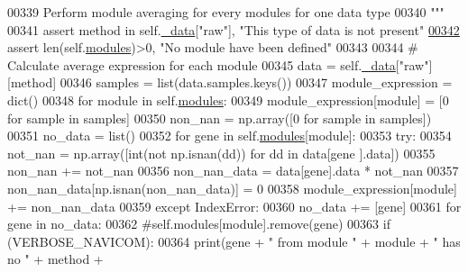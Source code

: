 \begin{DoxyCode}
00339 \textcolor{stringliteral}{        Perform module averaging for every modules for one data type}
00340 \textcolor{stringliteral}{        """}
00341         \textcolor{keyword}{assert} method \textcolor{keywordflow}{in} self.\hyperlink{classnavicom_1_1navicom_1_1NaviCom_a407b2b5c30a5652ee85c4be54b3e6679}{_data}[\textcolor{stringliteral}{"raw"}], \textcolor{stringliteral}{"This type of data is not present"}
\hypertarget{navicom_8py_source_l00342}{}\hyperlink{classnavicom_1_1navicom_1_1NaviCom_afd1a299b687bc97e171cff0a738b7b73}{00342}         \textcolor{keyword}{assert} len(self.\hyperlink{classnavicom_1_1navicom_1_1NaviCom_a56141660ddf29a36a8291e938246578c}{modules})>0, \textcolor{stringliteral}{"No module have been defined"}
00343 
00344         \textcolor{comment}{# Calculate average expression for each module}
00345         data = self.\hyperlink{classnavicom_1_1navicom_1_1NaviCom_a407b2b5c30a5652ee85c4be54b3e6679}{_data}[\textcolor{stringliteral}{"raw"}][method]
00346         samples = list(data.samples.keys())
00347         module\_expression = dict()
00348         \textcolor{keywordflow}{for} module \textcolor{keywordflow}{in} self.\hyperlink{classnavicom_1_1navicom_1_1NaviCom_a56141660ddf29a36a8291e938246578c}{modules}:
00349             module\_expression[module] = [0 \textcolor{keywordflow}{for} sample \textcolor{keywordflow}{in} samples]
00350             non\_nan = np.array([0 \textcolor{keywordflow}{for} sample \textcolor{keywordflow}{in} samples])
00351             no\_data = list()
00352             \textcolor{keywordflow}{for} gene \textcolor{keywordflow}{in} self.\hyperlink{classnavicom_1_1navicom_1_1NaviCom_a56141660ddf29a36a8291e938246578c}{modules}[module]:
00353                 \textcolor{keywordflow}{try}:
00354                     not\_nan = np.array([int(\textcolor{keywordflow}{not} np.isnan(dd)) \textcolor{keywordflow}{for} dd \textcolor{keywordflow}{in} data[gene
      ].data])
00355                     non\_nan += not\_nan
00356                     non\_nan\_data = data[gene].data * not\_nan
00357                     non\_nan\_data[np.isnan(non\_nan\_data)] = 0
00358                     module\_expression[module] += non\_nan\_data
00359                 \textcolor{keywordflow}{except} IndexError:
00360                     no\_data += [gene]
00361             \textcolor{keywordflow}{for} gene \textcolor{keywordflow}{in} no\_data:
00362                 \textcolor{comment}{#self.modules[module].remove(gene)}
00363                 \textcolor{keywordflow}{if} (VERBOSE\_NAVICOM):
00364                     \textcolor{keywordflow}{print}(gene + \textcolor{stringliteral}{" from module "} + module + \textcolor{stringliteral}{" has no "} + method +

\end{DoxyCode}
